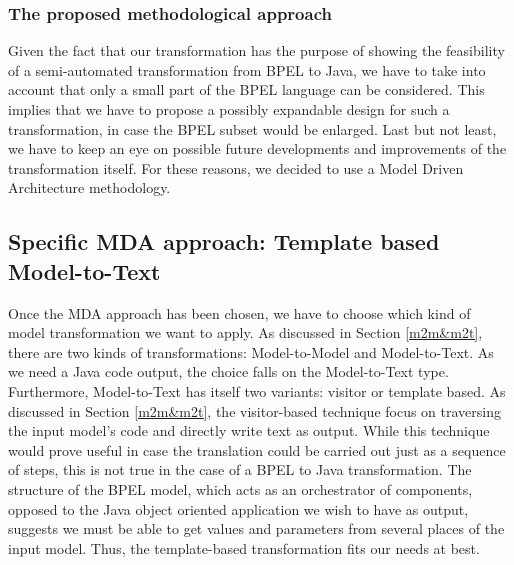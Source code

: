 \subsubsection{The proposed methodological approach}
Given the fact that our transformation has the purpose of showing the feasibility of a semi-automated transformation from BPEL to Java, we have to take into account that only a small part of the BPEL language can be considered. This implies that we have to propose a possibly expandable design for such a transformation, in case the BPEL subset would be enlarged. Last but not least, we have to keep an eye on possible future developments and improvements of the transformation itself. For these reasons, we decided to use a Model Driven Architecture methodology.

\subsection{Specific MDA approach: Template based Model-to-Text}
\label{sec:M2TApproach}
Once the MDA approach has been chosen, we have to choose which kind of model transformation we want to apply. As discussed in Section \ref{m2m&m2t}, there are two kinds of transformations: Model-to-Model and Model-to-Text. As we need a Java code output, the choice falls on the Model-to-Text type.
Furthermore, Model-to-Text has itself two variants: visitor or template based. As discussed in Section \ref{m2m&m2t}, the visitor-based technique focus on traversing the input model's code and directly write text as output. While this technique would prove useful in case the translation could be carried out just as a sequence of steps, this is not true in the case of a BPEL to Java transformation. The structure of the BPEL model, which acts as an orchestrator of components, opposed to the Java object oriented application we wish to have as output, suggests we must be able to get values and parameters from several places of the input model. Thus, the template-based transformation fits our needs at best.

